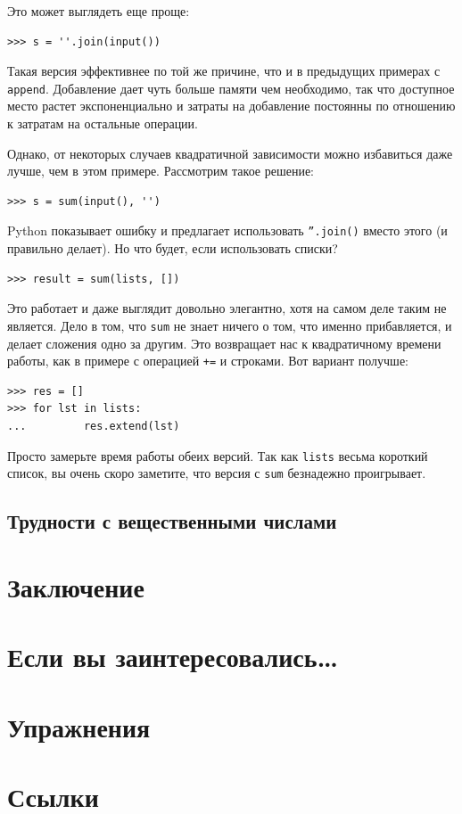Это может выглядеть еще проще:

\begin{lstlisting}
>>> s = ''.join(input())
\end{lstlisting}

Такая версия эффективнее по той же причине, что и в предыдущих примерах с \texttt{append}. Добавление дает чуть больше памяти чем необходимо, так что доступное место растет экспоненциально и затраты на добавление постоянны по отношению к затратам на остальные операции. 

Однако, от некоторых случаев квадратичной зависимости можно избавиться даже лучше, чем в этом примере. Рассмотрим такое решение:

\begin{lstlisting}
>>> s = sum(input(), '')
\end{lstlisting}

Python показывает ошибку и предлагает использовать \texttt{''.join()} вместо этого (и правильно делает). Но что будет, если использовать списки?

\begin{lstlisting}
>>> result = sum(lists, [])
\end{lstlisting}

Это работает и даже выглядит довольно элегантно, хотя на самом деле таким не является. Дело в том, что \texttt{sum} не знает ничего о том, что именно прибавляется, и делает сложения одно за другим. Это возвращает нас к квадратичному времени работы, как в примере с операцией \texttt{+=} и строками. Вот вариант получше:
\begin{lstlisting}
>>> res = []
>>> for lst in lists:
...			res.extend(lst)
\end{lstlisting}

Просто замерьте время работы обеих версий. Так как \texttt{lists} весьма короткий список, вы очень скоро заметите, что версия с \texttt{sum} безнадежно проигрывает.

\subsection{Трудности с вещественными числами}
\section{Заключение}
\section{Если вы заинтересовались…}
\section{Упражнения}
\section{Ссылки}






